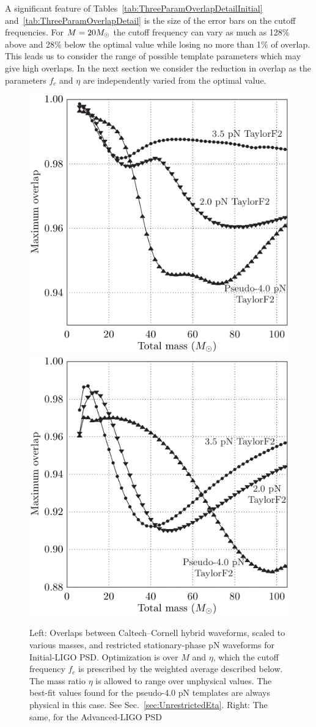 

A significant feature of
Tables~\ref{tab:ThreeParamOverlapDetailInitial}
and~\ref{tab:ThreeParamOverlapDetail} is the size of the error bars on
the cutoff frequencies.  For $M=20 M_{\odot}$ the cutoff frequency can
vary as much as 128\% above and 28\% below the optimal value while
losing no more than 1\% of overlap. This leads us to consider the
range of possible template parameters which may give high overlaps.
In the next section we consider the reduction in overlap as the
parameters $f_{c}$ and $\eta$ are independently varied from the
optimal value.

\begin{figure}
  \includegraphics[width=0.5\linewidth]{figures/comparison/ThreeParamOverlapSummaryInitial}
  \includegraphics[width=0.5\linewidth]{figures/comparison/ThreeParamOverlapSummaryAdvanced}
  \caption[Overlaps between Caltech--Cornell hybrid waveforms and pN waveforms]{
  \label{fig:ThreeParamOverlapSummaries}
    Left: Overlaps between Caltech--Cornell hybrid waveforms,
    scaled to various masses, and restricted stationary-phase pN
    waveforms for Initial-LIGO PSD. Optimization is over $M$ and
    $\eta$, which the cutoff frequency $f_{c}$ is prescribed by the
    weighted average described below.  The mass ratio $\eta$ is
    allowed to range over unphysical values.  The best-fit values
    found for the pseudo-4.0 pN templates are always physical in this
    case.  See Sec.~\ref{sec:UnrestrictedEta}.  Right: The same, for
    the Advanced-LIGO PSD}
\end{figure}%


